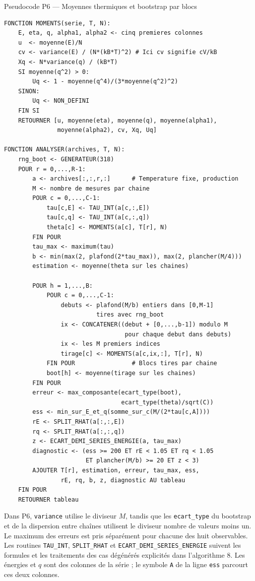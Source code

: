 \documentclass[10pt,a4paper]{article}
\begin{document}
\begin{algocode}{Pseudocode P6 --- Moyennes thermiques et bootstrap par blocs}
\small
\begin{verbatim}
FONCTION MOMENTS(serie, T, N):
    E, eta, q, alpha1, alpha2 <- cinq premieres colonnes
    u  <- moyenne(E)/N
    cv <- variance(E) / (N*(kB*T)^2) # Ici cv signifie cV/kB
    Xq <- N*variance(q) / (kB*T)
    SI moyenne(q^2) > 0:
        Uq <- 1 - moyenne(q^4)/(3*moyenne(q^2)^2)
    SINON:
        Uq <- NON_DEFINI
    FIN SI
    RETOURNER [u, moyenne(eta), moyenne(q), moyenne(alpha1),
               moyenne(alpha2), cv, Xq, Uq]

FONCTION ANALYSER(archives, T, N):
    rng_boot <- GENERATEUR(318)
    POUR r = 0,...,R-1:
        a <- archives[:,:,r,:]      # Temperature fixe, production
        M <- nombre de mesures par chaine
        POUR c = 0,...,C-1:
            tau[c,E] <- TAU_INT(a[c,:,E])
            tau[c,q] <- TAU_INT(a[c,:,q])
            theta[c] <- MOMENTS(a[c], T[r], N)
        FIN POUR
        tau_max <- maximum(tau)
        b <- min(max(2, plafond(2*tau_max)), max(2, plancher(M/4)))
        estimation <- moyenne(theta sur les chaines)

        POUR h = 1,...,B:
            POUR c = 0,...,C-1:
                debuts <- plafond(M/b) entiers dans [0,M-1]
                          tires avec rng_boot
                ix <- CONCATENER((debut + [0,...,b-1]) modulo M
                                  pour chaque debut dans debuts)
                ix <- les M premiers indices
                tirage[c] <- MOMENTS(a[c,ix,:], T[r], N)
            FIN POUR                # Blocs tires par chaine
            boot[h] <- moyenne(tirage sur les chaines)
        FIN POUR
        erreur <- max_composante(ecart_type(boot),
                                 ecart_type(theta)/sqrt(C))
        ess <- min_sur_E_et_q(somme_sur_c(M/(2*tau[c,A])))
        rE <- SPLIT_RHAT(a[:,:,E])
        rq <- SPLIT_RHAT(a[:,:,q])
        z <- ECART_DEMI_SERIES_ENERGIE(a, tau_max)
        diagnostic <- (ess >= 200 ET rE < 1.05 ET rq < 1.05
                       ET plancher(M/b) >= 20 ET z < 3)
        AJOUTER T[r], estimation, erreur, tau_max, ess,
                rE, rq, b, z, diagnostic AU tableau
    FIN POUR
    RETOURNER tableau
\end{verbatim}
\end{algocode}

Dans P6, \texttt{variance} utilise le diviseur $M$, tandis que les
\texttt{ecart\_type} du bootstrap et de la dispersion entre chaînes
utilisent le diviseur nombre de valeurs moins un. Le maximum des erreurs
est pris séparément pour chacune des huit observables. Les routines
\texttt{TAU\_INT}, \texttt{SPLIT\_RHAT} et
\texttt{ECART\_DEMI\_SERIES\_ENERGIE} suivent les formules et les
traitements des cas dégénérés explicités dans l'algorithme 8. Les énergies
et $q$ sont des colonnes de la série ; le symbole \texttt{A} de la ligne
\texttt{ess} parcourt ces deux colonnes.
\end{document}
